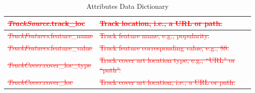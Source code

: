 \documentclass[12pt]{article}
\begin{document}
\begin{table}[htbp!]
\begin{tabular}{ p{.45\linewidth} || p{.55\linewidth} }
    \midrule
    \textcolor{red}{\sout{\emph{TrackSource}.track\_loc}} & \textcolor{red}{\sout{Track location, i.e., a URL or path.}} \\
    \midrule
    \textcolor{red}{\sout{\emph{TrackFeatures}.feature\_name}} & \textcolor{red}{\sout{Track feature name, e.g., popularity.}} \\
    \midrule
    \textcolor{red}{\sout{\emph{TrackFeatures}.feature\_value}} & \textcolor{red}{\sout{Track feature corresponding value, e.g., 88.}} \\
    \midrule
    \textcolor{red}{\sout{\emph{TrackCover}.cover\_loc\_type}} & \textcolor{red}{\sout{Track cover art location type, e.g., ``URL'' or ``path''.}} \\
    \midrule
    \textcolor{red}{\sout{\emph{TrackCover}.cover\_loc}} & \textcolor{red}{\sout{Track cover art location, i.e., a URL or path.}}\\
  \end{tabular}
  \label{tbl:attr-data-dict-old}
  \caption{Attributes Data Dictionary}
\end{table}
\vspace{1cm}
\end{document}
